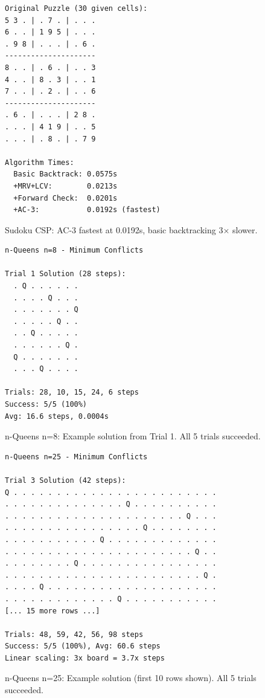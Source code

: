 \documentclass[letterpaper]{article}
\begin{document}
\begin{figure}[h]
\begin{scriptsize}
\begin{verbatim}
Original Puzzle (30 given cells):
5 3 . | . 7 . | . . .
6 . . | 1 9 5 | . . .
. 9 8 | . . . | . 6 .
---------------------
8 . . | . 6 . | . . 3
4 . . | 8 . 3 | . . 1
7 . . | . 2 . | . . 6
---------------------
. 6 . | . . . | 2 8 .
. . . | 4 1 9 | . . 5
. . . | . 8 . | . 7 9

Algorithm Times:
  Basic Backtrack: 0.0575s
  +MRV+LCV:        0.0213s
  +Forward Check:  0.0201s
  +AC-3:           0.0192s (fastest)
\end{verbatim}
\end{scriptsize}
\caption{Sudoku CSP: AC-3 fastest at 0.0192s, basic backtracking 3× slower.}
\label{fig:sudoku-csp}
\end{figure}

\begin{figure}[h]
\begin{scriptsize}
\begin{verbatim}
n-Queens n=8 - Minimum Conflicts

Trial 1 Solution (28 steps):
  . Q . . . . . .
  . . . . Q . . .
  . . . . . . . Q
  . . . . . Q . .
  . . Q . . . . .
  . . . . . . Q .
  Q . . . . . . .
  . . . Q . . . .

Trials: 28, 10, 15, 24, 6 steps
Success: 5/5 (100%)
Avg: 16.6 steps, 0.0004s
\end{verbatim}
\end{scriptsize}
\caption{n-Queens n=8: Example solution from Trial 1. All 5 trials succeeded.}
\label{fig:nqueens-8}
\end{figure}

\begin{figure}[h]
\begin{scriptsize}
\begin{verbatim}
n-Queens n=25 - Minimum Conflicts

Trial 3 Solution (42 steps):
Q . . . . . . . . . . . . . . . . . . . . . . . .
. . . . . . . . . . . . . . Q . . . . . . . . . .
. . . . . . . . . . . . . . . . . . . . . Q . . .
. . . . . . . . . . . . . . . . Q . . . . . . . .
. . . . . . . . . . . Q . . . . . . . . . . . . .
. . . . . . . . . . . . . . . . . . . . . . Q . .
. . . . . . . . Q . . . . . . . . . . . . . . . .
. . . . . . . . . . . . . . . . . . . . . . . Q .
. . . . Q . . . . . . . . . . . . . . . . . . . .
. . . . . . . . . . . . . Q . . . . . . . . . . .
[... 15 more rows ...]

Trials: 48, 59, 42, 56, 98 steps
Success: 5/5 (100%), Avg: 60.6 steps
Linear scaling: 3x board = 3.7x steps
\end{verbatim}
\end{scriptsize}
\caption{n-Queens n=25: Example solution (first 10 rows shown). All 5 trials succeeded.}
\label{fig:nqueens-25}
\end{figure}
\end{document}
